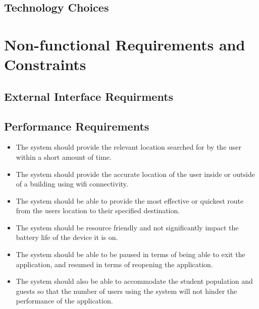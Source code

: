 \documentclass{article}
\begin{document}
		\clearpage
	
		\subsection{Technology Choices}\label{sec:technology-choices}
	
		
		\clearpage
		
	\section{Non-functional Requirements and Constraints}\label{sec: non-functional-requirments}
	
		\subsection{External Interface Requirments}\label{sec:external-inteface-requirments}
		
		\subsection{Performance Requirements}\label{sec:performance-requirements}
			\begin{itemize}
			\small
			\item The system should provide the relevant location searched for by the user within a short amount of time.
			\item The system should provide the accurate location of the user inside or outside of a building using wifi connectivity.
			\item The system should be able to provide the most effective or quickest route from the users location to their specified destination.
			\item The system should be resource friendly and not significantly impact the battery life of the device it is on.
			\item The system should be able to be paused in terms of being able to exit the application, and resumed in terms of reopening the application.
			\item The system should also be able to accommodate the student population and guests so that the number of users using the system will not hinder the performance of the application.
			\end{itemize}
		
\end{document}
